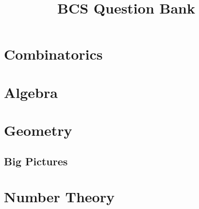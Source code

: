 \documentclass[a4paper, 12pt, oneside]{memoir}
\title{ \textbf{BCS Question Bank} \HRule{2pt} \\ [.5cm]}
\begin{document}
\maketitle\vfill \thispagestyle{empty}\newpage
\begingroup{\hypersetup{hidelinks}\tableofcontents}\thispagestyle{empty}\endgroup
\setcounter{page}{0}

% 
% 


\chapter{Combinatorics}
\thispagestyle{empty}
















	


\chapter{Algebra}
\thispagestyle{empty}











\chapter{Geometry}
\thispagestyle{empty}


















\section{Big Pictures}



\chapter{Number Theory}
\thispagestyle{empty}











\printindex[prob]
\printindex[thm]
\printindex[def]
\printindex[strat]
\printindex
\end{document}
